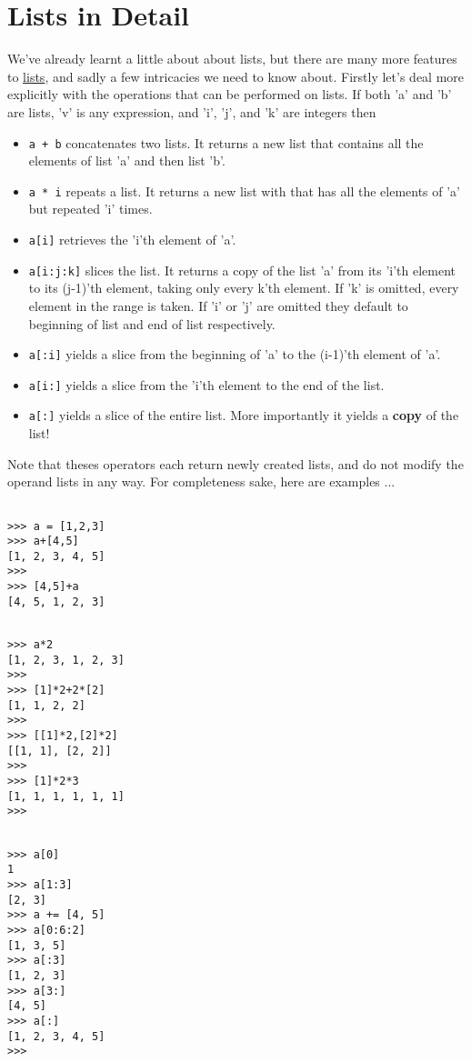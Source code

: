 \section{Lists in Detail}

We've already learnt a little about about lists, but there are many   more features to \href{http://docs.python.org/lib/typesseq.html}{lists}, and sadly a   few intricacies we need to know about. Firstly let's deal more   explicitly with the operations that can be performed on lists. If both   'a' and 'b' are lists, 'v' is any expression, and 'i', 'j', and 'k' are   integers then
\begin{itemize}
	\item 
\texttt{a + b} concatenates two lists. It returns a new list that contains all the elements of list 'a' and then list 'b'.
	\item 
\texttt{a * i} repeats a list. It returns a new list with that has all the elements of 'a' but repeated 'i' times.
	\item 
\texttt{a[i]} retrieves the 'i'th element of    'a'.
	\item 
\texttt{a[i:j:k]} slices the list. It returns a copy of the list 'a'    from its 'i'th element to its (j-1)'th element, taking only every    k'th element. If 'k' is omitted, every element in the range is    taken. If 'i' or 'j' are omitted they default to beginning of list    and end of list respectively.
	\item 
\texttt{a[:i]} yields a slice from the beginning of 'a' to    the (i-1)'th element of 'a'.
	\item 
\texttt{a[i:]} yields a slice from the 'i'th element to the    end of the list.
	\item 
\texttt{a[:]} yields a slice of the entire list. More    importantly it yields a \textbf{copy} of the list!
\end{itemize}

Note that theses operators each return newly created lists, and do   not modify the operand lists in any way. For completeness sake, here   are examples ...
\begin{lstlisting}

>>> a = [1,2,3]
>>> a+[4,5]
[1, 2, 3, 4, 5]
>>>
>>> [4,5]+a
[4, 5, 1, 2, 3]
\end{lstlisting}
\begin{lstlisting}

>>> a*2
[1, 2, 3, 1, 2, 3]
>>>
>>> [1]*2+2*[2]
[1, 1, 2, 2]
>>>
>>> [[1]*2,[2]*2]
[[1, 1], [2, 2]]
>>>
>>> [1]*2*3
[1, 1, 1, 1, 1, 1]
>>>
\end{lstlisting}
\begin{lstlisting}

>>> a[0]
1
>>> a[1:3]
[2, 3]
>>> a += [4, 5]
>>> a[0:6:2]
[1, 3, 5]
>>> a[:3]
[1, 2, 3]
>>> a[3:]
[4, 5]
>>> a[:]
[1, 2, 3, 4, 5]
>>>
\end{lstlisting}

